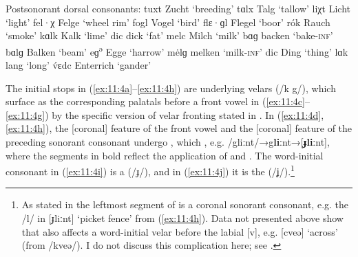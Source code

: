 \ea%
\label{ex:11:5}Postsonorant dorsal consonants:
\ea\label{ex:11:5a}  tuxt \tab [tʊxt] \tab  Zucht \tab ‘breeding’ 
\ex\label{ex:11:5b}  tɑlx \tab [tɑlx] \tab Talg \tab ‘tallow’ 
\ex\label{ex:11:5c}  liχt \tab [lɪçt] \tab  Licht \tab ‘light’ 
\ex\label{ex:11:5d}  fel·χ \tab [felç] \tab Felge \tab ‘wheel rim’ 
\ex\label{ex:11:5e}  fogl \tab [fɔɣl̩] \tab Vogel \tab ‘bird’ 
\ex\label{ex:11:5f}  flɛ·ɡl \tab [flɛ·ʝl̩] \tab Flegel \tab ‘boor’ 
\ex\label{ex:11:5g}  rók \tab [rok] \tab  Rauch \tab ‘smoke’ 
\ex\label{ex:11:5h}  kɑlk \tab [kɑlk] \tab Kalk \tab ‘lime’ 
\ex\label{ex:11:5i}  dic \tab [dɪc] \tab  dick \tab ‘fat’ 
\ex\label{ex:11:5j}  melc \tab [melc] \tab Milch \tab ‘milk’ 
\ex\label{ex:11:5k}  bɑɡ \tab [bɑgŋ̍] \tab backen \tab ‘bake\textsc{{}-inf}’ 
\ex\label{ex:11:5l}  bɑlɡ \tab [bɑlgŋ̍] \tab Balken \tab ‘beam’ 
\ex\label{ex:11:5m}  eɡ\textsuperscript{ə} \tab [eɟə] \tab Egge \tab ‘harrow’ 
\ex\label{ex:11:5n}  m\.{e}lɡ \tab [mɛlɟɲ̍] \tab melken \tab ‘milk\textsc{{}-inf}’ 
\ex\label{ex:11:5o}  dic \tab [dɪɲc] \tab Ding \tab ‘thing’ 
\ex\label{ex:11:5p}  lɑk \tab [lɑŋk] \tab lang \tab ‘long’ 
\ex\label{ex:11:5q}  \'{v}ɛdc \tab [vɛdc] \tab Enterrich \tab ‘gander’ 
\z 
\z 


The initial stops in (\ref{ex:11:4a}--\ref{ex:11:4h}) are underlying velars (/k g/), which surface as the corresponding palatals before a front vowel in (\ref{ex:11:4c}--\ref{ex:11:4g}) by the specific version of velar fronting stated in . In (\ref{ex:11:4d}, \ref{ex:11:4h}), the [coronal] feature of the front vowel and the [coronal] feature of the preceding sonorant consonant undergo , which  , e.g. /gliːnt/→{\textbar}g\textbf{liː}nt{\textbar}→[\textbf{ɟliː}nt], where the segments in bold reflect the application of  and . The word-initial consonant in (\ref{ex:11:4i}) is a  (/ɟ/), and in (\ref{ex:11:4j}) it is the  (/ʝ/).\footnote{As stated in  the leftmost segment of  is a coronal sonorant consonant, e.g. the /l/ in [ɟliːnt] ‘picket fence’ from (\ref{ex:11:4h}). Data not presented above show that  also affects a word-initial velar before the labial [v], e.g. [cveə] ‘across’ (from /kveə/). I do not discuss this complication here; see .}\largerpage

